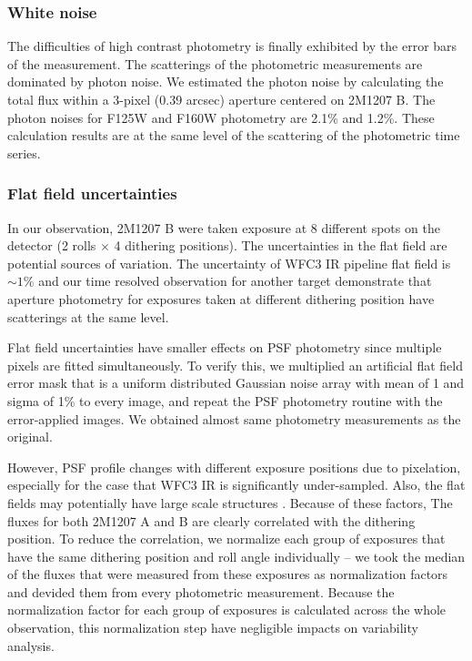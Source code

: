 \documentclass[apj]{emulateapj}
\begin{document}
\subsubsection{White noise}
The difficulties of high contrast photometry is finally exhibited by
the error bars of the measurement. The scatterings of the photometric
measurements are dominated by photon noise.  We estimated the photon
noise by calculating the total flux within a 3-pixel (0.39 arcsec)
aperture centered on 2M1207 B. The photon noises for F125W and F160W photometry are
2.1\% and 1.2\%. These calculation results are at the same level of
the scattering of the photometric time series.

\subsubsection{Flat field uncertainties}
In our observation, 2M1207 B were taken exposure at 8 different spots
on the detector (2 rolls $\times$ 4 dithering
positions). The uncertainties in the flat field are potential sources of variation. The uncertainty of WFC3 IR pipeline flat field
is $\sim 1\%$ \citep{dressel2012wide} and our time resolved observation for another target
demonstrate that aperture photometry for exposures taken at different
dithering position have scatterings at the same level.

Flat field uncertainties have smaller effects on PSF photometry since
multiple pixels are fitted simultaneously. To verify this, we multiplied
an artificial flat field error mask that is a uniform distributed
Gaussian noise array with mean of 1 and sigma of 1\% to every image,
and repeat the PSF photometry routine with the error-applied
images. We obtained almost same photometry measurements as the
original.

However, PSF profile changes with different exposure positions due to
pixelation, especially for the case that WFC3 IR is significantly
under-sampled. Also, the flat fields may potentially have large scale
structures \citep{dressel2012wide}. Because of these factors, The
fluxes for both 2M1207 A and B are clearly correlated with the
dithering position. To reduce the correlation, we normalize each group of exposures
that have the same dithering position and roll angle individually --
we took the median of the fluxes that were measured from these
exposures as normalization factors and devided them from every photometric
measurement. Because the normalization factor for each group of
exposures is calculated across the whole observation, this
normalization step have negligible impacts on variability analysis.
\end{document}
